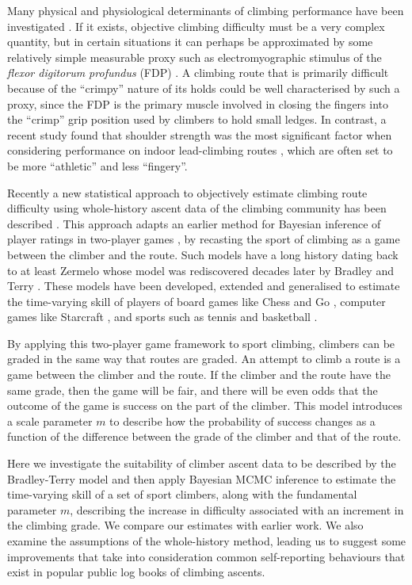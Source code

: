 \documentclass{article}
\begin{document}
Many physical and physiological determinants of climbing performance have been investigated \cite{balavs2012hand, balavs2014relationship, mackenzie2020physical}. If it exists, objective climbing difficulty must be a very complex quantity, but in certain situations it can perhaps be approximated by some relatively simple measurable proxy such as electromyographic stimulus of the {\it flexor digitorum profundus} (FDP) \cite{delignieres1993psychophysical}. A climbing route that is primarily difficult because of the ``crimpy'' nature of its holds could be well characterised by such a proxy, since the FDP is the primary muscle involved in closing the fingers into the ``crimp'' grip position used by climbers to hold small ledges. In contrast, a recent study found that shoulder strength was the most significant factor when considering performance on indoor lead-climbing routes \cite{mackenzie2020physical}, which are often set to be more ``athletic'' and less ``fingery''.

Recently a new statistical approach to objectively estimate climbing route difficulty using whole-history ascent data of the climbing community has been described \cite{scarff2020estimation}. This approach adapts an earlier method for Bayesian inference of player ratings in two-player games \cite{coulom2008whole}, by recasting the sport of climbing as a game between the climber and the route. Such models have a long history dating back to at least Zermelo \cite{zermelo1929berechnung} whose model was rediscovered decades later by Bradley and Terry \cite{bradley1952rank}. These models have been developed, extended and generalised to estimate the time-varying skill of players of board games like Chess \cite{Elo1978, glickman1999rating} and Go \cite{coulom2008whole}, computer games like Starcraft \cite{maystre2019pairwise}, and sports such as tennis \cite{maystre2019pairwise} and basketball \cite{maystre2019pairwise}.

By applying this two-player game framework to sport climbing, climbers can be graded in the same way that routes are graded. An attempt to climb a route is a game between the climber and the route. If the climber and the route have the same grade, then the game will be fair, and there will be even odds that the outcome of the game is success on the part of the climber. This model introduces a scale parameter $m$ to describe how the probability of success changes as a function of the difference between the grade of the climber and that of the route.

Here we investigate the suitability of climber ascent data to be described by the Bradley-Terry model and then apply Bayesian MCMC inference to estimate the time-varying skill of a set of sport climbers, along with the fundamental parameter $m$, describing the increase in difficulty associated with an increment in the climbing grade. We compare our estimates with earlier work. We also examine the assumptions of the whole-history method, leading us to suggest some improvements that take into consideration common self-reporting behaviours that exist in popular public log books of climbing ascents.
\end{document}
